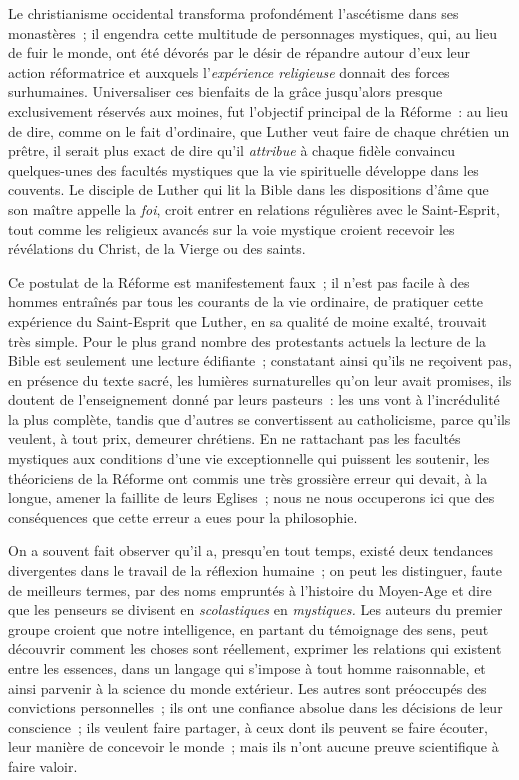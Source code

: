 \documentclass[french,twoside]{book} %
\begin{document}
\noindent Le christianisme occidental transforma profondément l’ascétisme dans ses monastères ; il engendra cette multitude de personnages mystiques, qui, au lieu de fuir le monde, ont été dévorés par le désir de répandre autour d’eux leur action réformatrice et auxquels l’\emph{expérience religieuse} donnait des forces surhumaines. Universaliser ces bienfaits de la grâce jusqu’alors presque exclusivement réservés aux moines, fut l’objectif principal de la Réforme : au lieu de dire, comme on le fait d’ordinaire, que Luther veut faire de chaque chrétien un prêtre, il serait plus exact de dire qu’il \emph{attribue} à chaque fidèle convaincu quelques-unes des facultés mystiques que la vie spirituelle développe dans les couvents. Le disciple de Luther qui lit la Bible dans les dispositions d’âme que son maître appelle la \emph{foi}, croit entrer en relations régulières avec le Saint-Esprit, tout comme les religieux avancés  sur la voie mystique croient recevoir les révélations du Christ, de la Vierge ou des saints.\par
Ce postulat de la Réforme est manifestement faux ; il n’est pas facile à des hommes entraînés par tous les courants de la vie ordinaire, de pratiquer cette expérience du Saint-Esprit que Luther, en sa qualité de moine exalté, trouvait très simple. Pour le plus grand nombre des protestants actuels la lecture de la Bible est seulement une lecture édifiante ; constatant ainsi qu’ils ne reçoivent pas, en présence du texte sacré, les lumières surnaturelles qu’on leur avait promises, ils doutent de l’enseignement donné par leurs pasteurs : les uns vont à l’incrédulité la plus complète, tandis que d’autres se convertissent au catholicisme, parce qu’ils veulent, à tout prix, demeurer chrétiens. En ne rattachant pas les facultés mystiques aux conditions d’une vie exceptionnelle qui puissent les soutenir, les théoriciens de la Réforme ont commis une très grossière erreur qui devait, à la longue, amener la faillite de leurs Eglises ; nous ne nous occuperons ici que des conséquences que cette erreur a eues pour la philosophie.\par
On a souvent fait observer qu’il a, presqu’en tout temps, existé deux tendances divergentes dans le travail de la réflexion humaine ; on peut les distinguer, faute de meilleurs termes, par des noms empruntés à l’histoire du Moyen-Age et dire que les penseurs se divisent en \emph{scolastiques} en \emph{mystiques.} Les auteurs du premier groupe croient que notre intelligence, en partant du témoignage des sens, peut découvrir comment les choses sont réellement, exprimer les relations qui existent entre les essences, dans un langage qui s’impose à tout homme raisonnable,  et ainsi parvenir à la science du monde extérieur. Les autres sont préoccupés des convictions personnelles ; ils ont une confiance absolue dans les décisions de leur conscience ; ils veulent faire partager, à ceux dont ils peuvent se faire écouter, leur manière de concevoir le monde ; mais ils n’ont aucune preuve scientifique à faire valoir.\par
\end{document}
